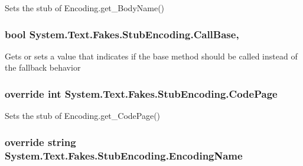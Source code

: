 Sets the stub of Encoding.\-get\-\_\-\-Body\-Name()

\hypertarget{class_system_1_1_text_1_1_fakes_1_1_stub_encoding_a317864b0eb0388d14b7a4e5c7b83e024}{
\subsubsection[{Call\-Base}]{\setlength{\rightskip}{0pt plus 5cm}bool System.\-Text.\-Fakes.\-Stub\-Encoding.\-Call\-Base\hspace{0.3cm}{\ttfamily [get]}, {\ttfamily [set]}}}\label{class_system_1_1_text_1_1_fakes_1_1_stub_encoding_a317864b0eb0388d14b7a4e5c7b83e024}


Gets or sets a value that indicates if the base method should be called instead of the fallback behavior

\hypertarget{class_system_1_1_text_1_1_fakes_1_1_stub_encoding_ac61290f790c10ec25a050e80a4fca787}{
\subsubsection[{Code\-Page}]{\setlength{\rightskip}{0pt plus 5cm}override int System.\-Text.\-Fakes.\-Stub\-Encoding.\-Code\-Page\hspace{0.3cm}{\ttfamily [get]}}}\label{class_system_1_1_text_1_1_fakes_1_1_stub_encoding_ac61290f790c10ec25a050e80a4fca787}


Sets the stub of Encoding.\-get\-\_\-\-Code\-Page()

\hypertarget{class_system_1_1_text_1_1_fakes_1_1_stub_encoding_a211ab9e9c1173217b09f390166c9dee6}{
\subsubsection[{Encoding\-Name}]{\setlength{\rightskip}{0pt plus 5cm}override string System.\-Text.\-Fakes.\-Stub\-Encoding.\-Encoding\-Name\hspace{0.3cm}{\ttfamily [get]}}}\label{class_system_1_1_text_1_1_fakes_1_1_stub_encoding_a211ab9e9c1173217b09f390166c9dee6}


